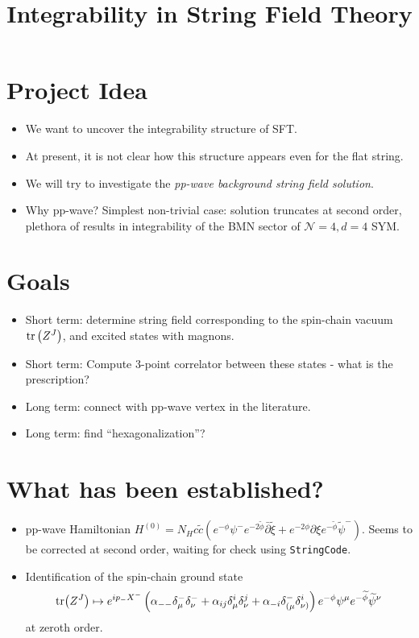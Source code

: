 \documentclass[12pt]{article}
\numberwithin{equation}{section}
\newcommand{\WT}[1]{\widetilde{#1}}
\newcommand{\B}[1]{\bar{#1}}
\begin{document}
\title{Integrability in String Field Theory}

\maketitle
\section{Project Idea}
\begin{itemize}
    \item We want to uncover the integrability structure of SFT.
    \item At present, it is not clear how this structure appears even for the flat string.
    \item We will try to investigate the \textit{pp-wave background string field solution}.
    \item Why pp-wave? Simplest non-trivial case: solution truncates at second order, plethora of results in integrability of the BMN sector of $\mathcal{N}=4,d=4$ SYM.
\end{itemize}

\section{Goals}
\begin{itemize}
    \item Short term: determine string field corresponding to the spin-chain vacuum $\tr\left(Z^J\right)$, and excited states with magnons.
    \item Short term: Compute 3-point correlator between these states - what is the prescription?
    \item Long term: connect with pp-wave vertex in the literature.
    \item Long term: find ``hexagonalization''?
\end{itemize}

\section{What has been established?}
\begin{itemize}
    \item pp-wave Hamiltonian $H^{(0)}=N_H c\WT{c}\left( e^{-\phi}\psi^-e^{-2\WT{\phi}}\B{\partial}\WT{\xi}+e^{-2\phi}\partial\xi e^{-\WT{\phi}}\WT{\psi}^- \right)$. Seems to be corrected at second order, waiting for check using \texttt{StringCode}.
    \item Identification of the spin-chain ground state 
    $$\tr(Z^J)\mapsto e^{ip_-X^-}\left(\alpha_{--}\delta_{\mu}^{-}\delta_{\nu}^{-}+\alpha_{ij}\delta_{\mu}^i\delta_{\nu}^j+\alpha_{-i}\delta_{(\mu}^-\delta_{\nu)}^i\right)e^{-\phi}\psi^{\mu}e^{-\WT{\phi}}\WT{\psi}^{\nu}$$
    at zeroth order.
\end{itemize}
\end{document}
